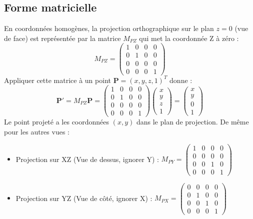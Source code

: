 \subsection{Forme matricielle}
En coordonnées homogènes, la projection orthographique sur le plan \( z=0 \) (vue de face) est représentée par la matrice \( M_{PZ} \) qui met la coordonnée Z à zéro :
\[ M_{PZ} = \begin{pmatrix} 1 & 0 & 0 & 0 \\ 0 & 1 & 0 & 0 \\ 0 & 0 & 0 & 0 \\ 0 & 0 & 0 & 1 \end{pmatrix} \]
Appliquer cette matrice à un point \( \mathbf{P} = (x, y, z, 1)^T \) donne :
\[ \mathbf{P'} = M_{PZ} \mathbf{P} = \begin{pmatrix} 1 & 0 & 0 & 0 \\ 0 & 1 & 0 & 0 \\ 0 & 0 & 0 & 0 \\ 0 & 0 & 0 & 1 \end{pmatrix} \begin{pmatrix} x \\ y \\ z \\ 1 \end{pmatrix} = \begin{pmatrix} x \\ y \\ 0 \\ 1 \end{pmatrix} \]
Le point projeté a les coordonnées \( (x, y) \) dans le plan de projection.
De même pour les autres vues :
\begin{itemize}
    \item Projection sur XZ (Vue de dessus, ignorer Y) : \( M_{PY} = \begin{pmatrix} 1 & 0 & 0 & 0 \\ 0 & 0 & 0 & 0 \\ 0 & 0 & 1 & 0 \\ 0 & 0 & 0 & 1 \end{pmatrix} \)
    \item Projection sur YZ (Vue de côté, ignorer X) : \( M_{PX} = \begin{pmatrix} 0 & 0 & 0 & 0 \\ 0 & 1 & 0 & 0 \\ 0 & 0 & 1 & 0 \\ 0 & 0 & 0 & 1 \end{pmatrix} \)
\end{itemize}

